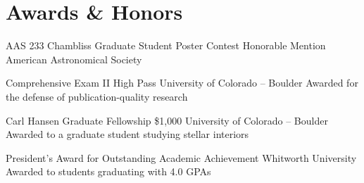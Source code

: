 \section{Awards \& Honors}

		{AAS 233 Chambliss Graduate Student Poster Contest}
		{Honorable Mention}
		{American Astronomical Society}
		{}
		{}

		{Comprehensive Exam II High Pass}
		{}
		{University of Colorado -- Boulder}
		{}
		{Awarded for the defense of publication-quality research}

        {Carl Hansen Graduate Fellowship}
        {\$1,000}
        {University of Colorado -- Boulder}
        {}
        {Awarded to a graduate student studying stellar interiors}


        {President's Award for Outstanding Academic Achievement}
        {}
        {Whitworth University}
        {}
        {Awarded to students graduating with 4.0 GPAs}

